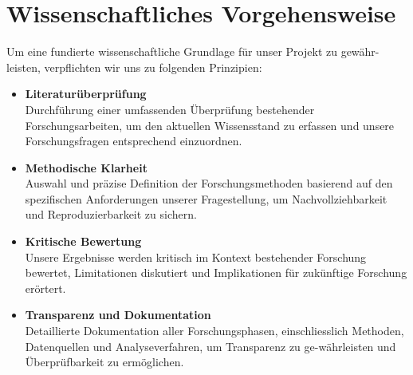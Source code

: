 \section{Wissenschaftliches Vorgehensweise}

Um eine fundierte wissenschaftliche Grundlage für unser Projekt zu gewähr-leisten, verpflichten wir uns zu folgenden Prinzipien:

\begin{itemize}
    \item \textbf{Literaturüberprüfung} \\
    Durchführung einer umfassenden Überprüfung bestehender Forschungsarbeiten, um den aktuellen Wissensstand zu erfassen und unsere Forschungsfragen entsprechend einzuordnen.
    
    \item \textbf{Methodische Klarheit} \\ 
    Auswahl und präzise Definition der Forschungsmethoden basierend auf den spezifischen Anforderungen unserer Fragestellung, um Nachvollziehbarkeit und Reproduzierbarkeit zu sichern.
    
    \item \textbf{Kritische Bewertung} \\
    Unsere Ergebnisse werden kritisch im Kontext bestehender Forschung bewertet, Limitationen diskutiert und Implikationen für zukünftige Forschung erörtert.
    
    \item \textbf{Transparenz und Dokumentation} \\
    Detaillierte Dokumentation aller Forschungsphasen, einschliesslich Methoden, Datenquellen und Analyseverfahren, um Transparenz zu ge-währleisten und Überprüfbarkeit zu ermöglichen.
    
\end{itemize}